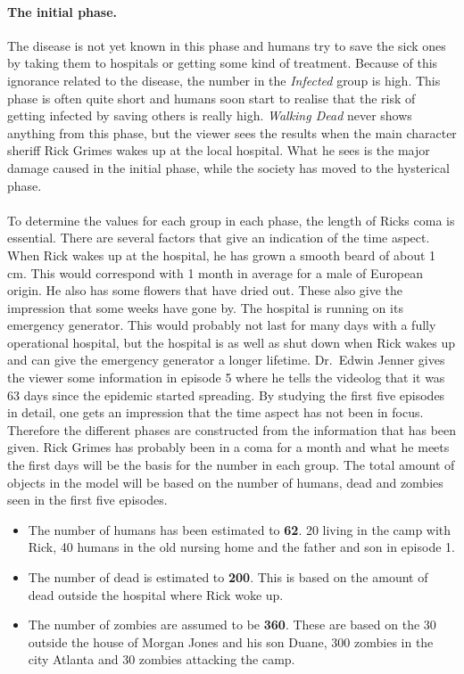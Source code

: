 \documentclass[%
twoside,                 %
final,                   %
chapterprefix=true,      %
open=right               %
10pt]{book}
\begin{document}
\paragraph{The initial phase.}
The disease is not yet known in this phase and humans try to save the sick ones by taking them to hospitals or getting some kind of treatment. Because of this ignorance related to the disease, the number in the \emph{Infected} group is high. This phase is often quite short and humans soon start to realise that the risk of getting infected by saving others is really high. \emph{Walking Dead} never shows anything from this phase, but the viewer sees the results when the main character sheriff Rick Grimes wakes up at the local hospital. What he sees is the major damage caused in the initial phase, while the society has moved to the hysterical phase.
\\
\\
To determine the values for each group in each phase, the length of Ricks coma is essential. There are several factors that give an indication of the time aspect. When Rick wakes up at the hospital, he has grown a smooth beard of about 1 cm. This would correspond with 1 month in average for a male of European origin. He also has some flowers that have dried out. These also give the impression that some weeks have gone by. The hospital is running on its emergency generator. This would probably not last for many days with a fully operational hospital, but the hospital is as well as shut down when Rick wakes up and can give the emergency generator a longer lifetime. Dr.~Edwin Jenner gives the viewer some information in episode 5 where he tells the videolog that it was 63 days since the epidemic started spreading. By studying the first five episodes in detail, one gets an impression that the time aspect has not been in focus. Therefore the different phases are constructed from the information that has been given. Rick Grimes has probably been in a coma for a month and what he meets the first days will be the basis for the number in each group. The total amount of objects in the model will be based on the number of humans, dead and zombies seen in the first five episodes. 
\begin{itemize}
 \item The number of humans has been estimated to \textbf{62}. 20 living in the camp with Rick, 40 humans in the old nursing home and the father and son in episode 1. 

 \item The number of dead is estimated to \textbf{200}. This is based on the amount of dead outside the hospital where Rick woke up. 

 \item The number of zombies are assumed to be \textbf{360}. These are based on the 30 outside the house of Morgan Jones and his son Duane, 300 zombies in the city Atlanta and 30 zombies attacking the camp. 
\end{itemize}
\end{document}
